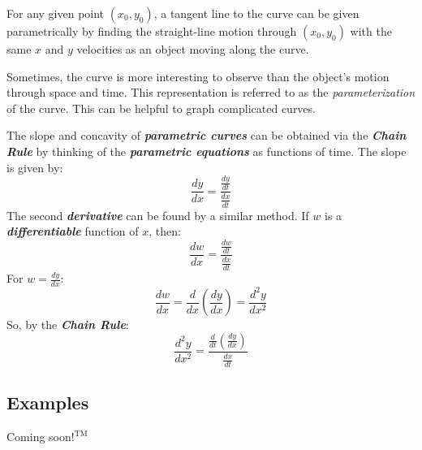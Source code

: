 \vspace{0.1in}
For any given point $\left(x_0, y_0\right)$, a tangent line to the curve can be given parametrically by finding the straight-line motion through  $\left(x_0, y_0\right)$ with the same $x$ and $y$ velocities as an object moving along the curve.

\vspace{0.1in}
Sometimes, the curve is more interesting to observe than the object's motion through space and time. This representation is referred to as the \textit{parameterization} of the curve. This can be helpful to graph complicated curves.

\vspace{0.1in}
The slope and concavity of \textbf{\textit{parametric curves}} can be obtained via the \textbf{\textit{Chain Rule}} by thinking of the \textbf{\textit{parametric equations}} as functions of time. The slope is given by:
%
\begin{equation}
\frac{dy}{dx} = \frac{\frac{dy}{dt}}{\frac{dx}{dt}}
\end{equation}
%
The second \textbf{\textit{derivative}} can be found by a similar method. If $w$ is a \textbf{\textit{differentiable}} function of $x$, then:
%
\begin{equation}
\frac{dw}{dx} = \frac{\frac{dw}{dt}}{\frac{dx}{dt}}
\end{equation}
%
For $w = \frac{dy}{dx}$:
%
\begin{equation}
\frac{dw}{dx} = \frac{d}{dx}\left(\frac{dy}{dx}\right) = \frac{d^2y}{dx^2}
\end{equation}
%
So, by the \textbf{\textit{Chain Rule}}:
%
\begin{equation}
\frac{d^2y}{dx^2} = \frac{\frac{d}{dt}\left(\frac{dy}{dx}\right)}{\frac{dx}{dt}}
\end{equation}
%

\begin{center}
\section*{\small Examples}
Coming soon$!^{\text{TM}}$
\end{center}